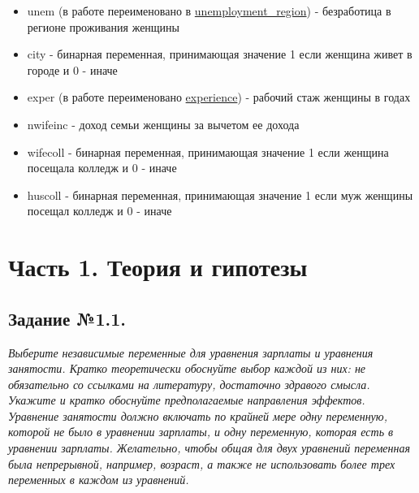 \documentclass[a4paper,12pt]{article}
\begin{document}
\begin{itemize}
		\vspace{0.3cm}
		
		\item unem (в работе переименовано в \underline{unemployment\_region}) - безработица в регионе проживания женщины
		
		\vspace{0.3cm}
		
		\item city - бинарная переменная, принимающая значение 1
		       если женщина живет в городе и 0 - иначе
		       
		 \vspace{0.3cm}
		 
		\item exper (в работе переименовано \underline{experience}) - рабочий стаж женщины в годах
		
	    \vspace{0.3cm}
	    
		\item nwifeinc - доход семьи женщины за вычетом ее дохода
		\item wifecoll - бинарная переменная, принимающая значение 1
		            если женщина посещала колледж и 0 - иначе
		\item huscoll - бинарная переменная, принимающая значение 1
		           если муж женщины посещал колледж и 0 - иначе
	\end{itemize}
	
	\newpage
	\section{Часть 1. Теория и гипотезы}
	
	\subsection{Задание №1.1.}
	\textit{
	Выберите независимые переменные для уравнения зарплаты и уравнения занятости. Кратко теоретически обоснуйте выбор каждой из них: не обязательно со ссылками на литературу, достаточно здравого смысла. Укажите и кратко обоснуйте предполагаемые направления эффектов. Уравнение занятости должно включать по крайней мере одну переменную, которой не было в уравнении зарплаты, и одну переменную,
	которая есть в уравнении зарплаты. Желательно, чтобы общая для двух уравнений
	переменная была непрерывной, например, возраст, а также не использовать более трех
	переменных в каждом из уравнений.}
	
	\vspace{0.3cm}
	
\end{document}

